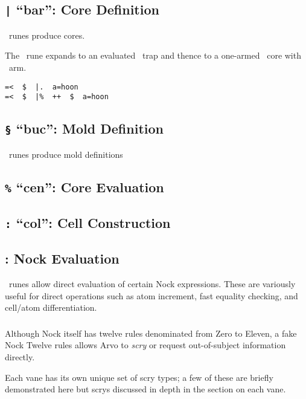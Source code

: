 \subsection{\texttt{|} “bar”:  Core Definition}

\pbar~runes produce cores.

The \barhep~rune expands to an evaluated \bardot~trap and thence to a one-armed \barcen~core with \buc~arm.

\begin{lstlisting}[style=nonumbers]
=<  $  |.  a=hoon
=<  $  |%  ++  $  a=hoon
\end{lstlisting}


\subsection{\texttt{\S} “buc”:  Mold Definition}

\pbuc~runes produce mold definitions

\subsection{\texttt{\%} “cen”:  Core Evaluation}

\subsection{\texttt{:} “col”:  Cell Construction}

\subsection{\pdot:  Nock Evaluation}

\pdot~runes allow direct evaluation of certain Nock expressions.  These are variously useful for direct operations such as atom increment, fast equality checking, and cell/atom differentiation.

\subsubsection{\pdotket}

Although Nock itself has twelve rules denominated from Zero to Eleven, a fake Nock Twelve rules allows Arvo to \emph{scry} or request out-of-subject information directly.

Each vane has its own unique set of scry types; a few of these are briefly demonstrated here but scrys discussed in depth in the section on each vane.

